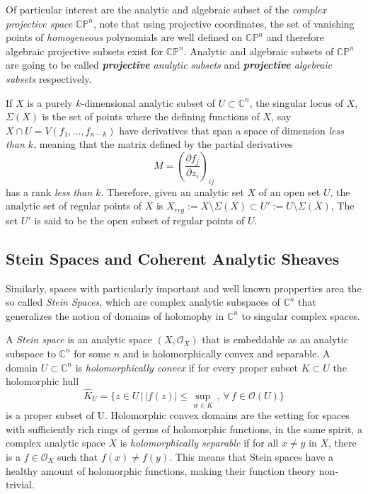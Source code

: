 \documentclass[12pt,twoside,a4paper]{report}
\newcommand{\con}{\ensuremath{\mathbb{C}^n}}
\newcommand{\cp}{\ensuremath{\mathbb{CP}}}
\newcommand{\sig}{\ensuremath{\Sigma}}
\newcommand{\osheaf}{\ensuremath{\mathcal O }}
\begin{document}
  Of particular interest are the analytic and algebraic subset of the \emph{complex projective space} $\cp^{n}$, note that using projective coordinates, the set of vanishing points of \emph{homogeneous} polynomials are well defined on $\cp^n$ and therefore algebraic projective subsets exist for $\cp^{n}$. Analytic and algebraic subsets of $\cp^n$ are going to be called \emph{\textbf{projective} analytic subsets} and \emph{\textbf{projective} algebraic subsets} respectively.

  If $X$ is a purely $k$-dimensional analytic subset of $U\subset\con$, the singular locus of $X$, $\sig(X)$ is the set of points where the defining functions of $X$, say $X\cap U=V(f_{1},\dots,f_{n-k})$ have derivatives that span a space of dimension \emph{less than $k$}, meaning that the matrix defined by the partial derivatives
  \[
    M=\left(\dfrac{\partial f_{j}}{\partial z_{i}}\right)_{ij}
  \]
  has a rank \emph{less than $k$}. Therefore, given an analytic set $X$ of an open set $U$, the analytic set of regular points of $X$ is $X_{reg}:=X\setminus \sig(X)\subset U':=U\setminus \sig(X)$, The set $U'$ is said to be the open subset of regular points of $U$.

  \subsection{Stein Spaces and Coherent Analytic Sheaves}
  Similarly, spaces with particularly important and well known propperties area the so called \emph{Stein Spaces}, which are complex analytic subspaces of $\con$ that generalizes the notion of domains of holomophy in $\con$ to singular complex spaces.

  A \emph{Stein space} is an analytic space $(X,\osheaf_X)$ that is embeddable as an analytic subspace to $\con$ for some $n$ and is holomorphically convex and separable. A domain $U\subset\con$ is \emph{holomorphically convex} if for every proper subset $K\subset U$ the holomorphic hull
  \[
    \hat{K}_U=\{z\in U\,|\,|f(z)|\leq\sup_{w\in K}\, , \,\forall\,f\in\osheaf(U)\}
  \]
  is a proper subset of U. Holomorphic convex domains are the setting for spaces with sufficiently rich rings of germs of holomorphic functions, in the same spirit, a complex analytic space $X$ is \emph{holomorphically separable} if for all $x\neq y$ in $X$, there is a $f\in\osheaf_X$ such that $f(x)\neq f(y)$. This means that Stein spaces have a healthy amount of holomorphic functions, making their function theory non-trivial. 
\end{document}
